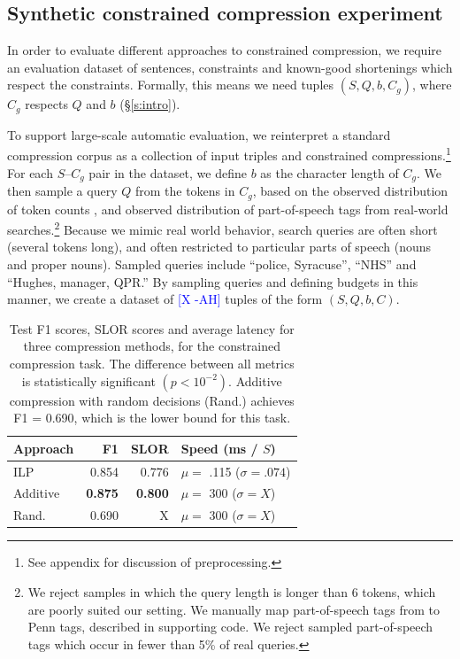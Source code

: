\documentclass[11pt,a4paper]{article}
\newcommand{\ahcomment}[1]{\textcolor{blue}{[#1 -AH]}}
\begin{document}
\subsection{Synthetic constrained compression experiment}

In order to evaluate different approaches to constrained compression, we require an evaluation dataset of sentences, constraints and known-good shortenings which respect the constraints. Formally, this means we need tuples $(S, Q, b, C_g)$, where $C_g$ respects $Q$ and $b$ (\S\ref{s:intro}).

To support large-scale automatic evaluation, we reinterpret a standard compression corpus \cite{filippova2013overcoming}
as a collection of input triples and constrained compressions.\footnote{See appendix for discussion of preprocessing.} For each $S$--$C_g$ pair in the dataset, we define $b$ as the character length of $C_g$. We then sample a query $Q$ from the tokens in $C_g$, based on the observed distribution of token counts \cite{Jansen2000RealLR}, and observed distribution of part-of-speech tags \cite{Barr2008TheLS} from real-world searches.\footnote{We reject samples in which the query length is longer than 6 tokens, which are poorly suited our setting. We manually map part-of-speech tags from \citet{Barr2008TheLS} to Penn tags, described in supporting code. We reject sampled part-of-speech tags which occur in fewer than 5\% of real queries.} Because we mimic real world behavior, search queries are often short (several tokens long), and often restricted to particular parts of speech (nouns and proper nouns). Sampled queries include ``police, Syracuse'', ``NHS'' and ``Hughes, manager, QPR.'' By sampling queries and defining budgets in this manner, we create a dataset of \ahcomment{X} tuples of the form $(S,Q,b,C)$.

\begin{table}[]
\begin{tabular}{lrrl}
\centering
Approach & F1 & SLOR &  Speed {\small (ms / $S$)}  \\ \hline
ILP &  {\small 0.854}   &  {\small 0.776 }  & {\small $\mu=$ .115} ({\small $ \sigma=.074$}) \\
Additive &  {\small \textbf{0.875}}  & {\small \textbf{0.800} }& {\small $\mu=$ 300} ({\small $ \sigma=X$}) \\
Rand.  &  {\small 0.690}  & { X }& {\small $\mu=$ 300} ({\small $ \sigma=X$}) \\
\end{tabular}
\caption{Test F1 scores, SLOR scores and average latency for three compression methods, for the constrained compression task. The difference between all metrics is statistically significant {\small $(p < 10^{-2})$}. Additive compression with random decisions (Rand.) achieves F1 = 0.690, which is the lower bound for this task.}
\label{t:results}
\end{table}
\end{document}
